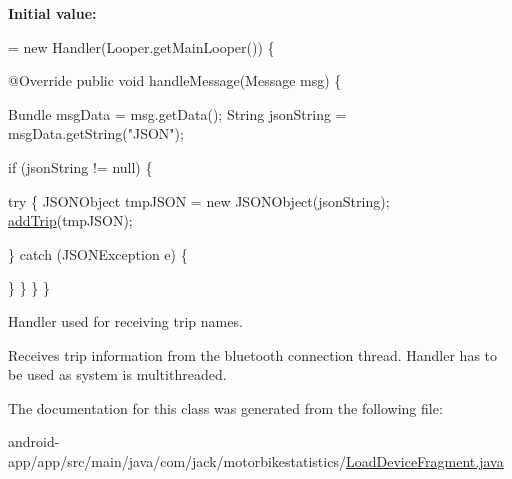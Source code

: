 {\bfseries Initial value\+:}
\begin{DoxyCode}
= \textcolor{keyword}{new} Handler(Looper.getMainLooper()) \{

        
        @Override
        \textcolor{keyword}{public} \textcolor{keywordtype}{void} handleMessage(Message msg) \{

            Bundle msgData = msg.getData();
            String jsonString = msgData.getString(\textcolor{stringliteral}{"JSON"});

            \textcolor{keywordflow}{if} (jsonString != null) \{

                
                \textcolor{keywordflow}{try} \{
                    JSONObject tmpJSON = \textcolor{keyword}{new} JSONObject(jsonString);
                    \hyperlink{classcom_1_1jack_1_1motorbikestatistics_1_1_load_device_fragment_a23957dbe1518052c7167d86938a14c35}{addTrip}(tmpJSON);

                \} \textcolor{keywordflow}{catch} (JSONException e) \{
                    
                \}
            \}
        \}
    \}
\end{DoxyCode}


Handler used for receiving trip names. 

Receives trip information from the bluetooth connection thread. Handler has to be used as system is multithreaded. 

The documentation for this class was generated from the following file\+:\begin{DoxyCompactItemize}
\item 
android-\/app/app/src/main/java/com/jack/motorbikestatistics/\hyperlink{_load_device_fragment_8java}{Load\+Device\+Fragment.\+java}\end{DoxyCompactItemize}
